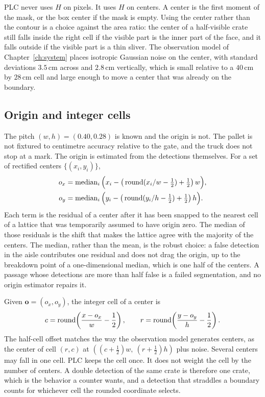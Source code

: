 PLC never uses $H$ on pixels. It uses $H$ on centers. A center is the first moment of the mask, or the box center if the mask is empty. Using the center rather than the contour is a choice against the area ratio: the center of a half-visible crate still falls inside the right cell if the visible part is the inner part of the face, and it falls outside if the visible part is a thin sliver. The observation model of Chapter~\ref{ch:system} places isotropic Gaussian noise on the center, with standard deviations $3.5\,\mathrm{cm}$ across and $2.8\,\mathrm{cm}$ vertically, which is small relative to a $40\,\mathrm{cm}$ by $28\,\mathrm{cm}$ cell and large enough to move a center that was already on the boundary.

\subsection{Origin and integer cells}
\label{sec:plc-origin}

The pitch $(w,h)=(0.40,0.28)$ is known and the origin is not. The pallet is not fixtured to centimetre accuracy relative to the gate, and the truck does not stop at a mark. The origin is estimated from the detections themselves. For a set of rectified centers $\{(x_i,y_i)\}$,
\begin{equation}
\begin{aligned}
o_x &= \operatorname{median}_i \Big(
x_i - \big(\operatorname{round}(x_i/w - \tfrac{1}{2})+\tfrac{1}{2}\big)\, w
\Big),\\
o_y &= \operatorname{median}_i \Big(
y_i - \big(\operatorname{round}(y_i/h - \tfrac{1}{2})+\tfrac{1}{2}\big)\, h
\Big).
\end{aligned}
\label{eq:origin}
\end{equation}
Each term is the residual of a center after it has been snapped to the nearest cell of a lattice that was temporarily assumed to have origin zero. The median of those residuals is the shift that makes the lattice agree with the majority of the centers. The median, rather than the mean, is the robust choice: a false detection in the aisle contributes one residual and does not drag the origin, up to the breakdown point of a one-dimensional median, which is one half of the centers. A passage whose detections are more than half false is a failed segmentation, and no origin estimator repairs it.

Given $\mathbf{o}=(o_x,o_y)$, the integer cell of a center is
\begin{equation}
c = \operatorname{round}\!\left(\frac{x-o_x}{w}-\frac{1}{2}\right),
\qquad
r = \operatorname{round}\!\left(\frac{y-o_y}{h}-\frac{1}{2}\right).
\label{eq:snap}
\end{equation}
The half-cell offset matches the way the observation model generates centers, as the center of cell $(r,c)$ at $((c+\tfrac{1}{2})w,\ (r+\tfrac{1}{2})h)$ plus noise. Several centers may fall in one cell. PLC keeps the cell once. It does not weight the cell by the number of centers. A double detection of the same crate is therefore one crate, which is the behavior a counter wants, and a detection that straddles a boundary counts for whichever cell the rounded coordinate selects.

